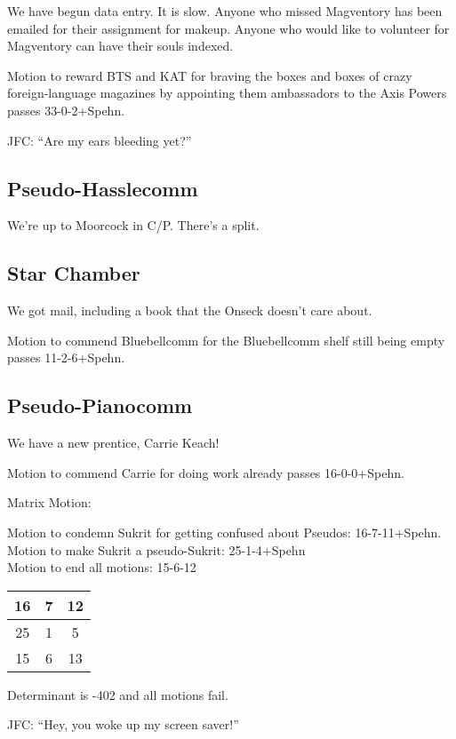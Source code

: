 \documentclass[10pt]{article}
\begin{document}
We have begun data entry.  It is slow.  Anyone who missed Magventory has been emailed for their assignment for makeup.  Anyone who would like to volunteer for Magventory can have their souls indexed.

Motion to reward BTS and KAT for braving the boxes and boxes of crazy foreign-language magazines by appointing them ambassadors to the Axis Powers passes 33-0-2+Spehn.  

JFC: ``Are my ears bleeding yet?''

\subsection*{Pseudo-Hasslecomm}

We're up to Moorcock in C/P.  There's a split.

\subsection*{Star Chamber}

We got mail, including a book that the Onseck doesn't care about.

Motion to commend Bluebellcomm for the Bluebellcomm shelf still being empty passes 11-2-6+Spehn.

\subsection*{Pseudo-Pianocomm}

We have a new prentice, Carrie Keach!

Motion to commend Carrie for doing work already passes 16-0-0+Spehn.

Matrix Motion:

\noindent
Motion to condemn Sukrit for getting confused about Pseudos: 16-7-11+Spehn.\\
Motion to make Sukrit a pseudo-Sukrit: 25-1-4+Spehn\\
Motion to end all motions: 15-6-12\\

\begin{tabular}{|c|c|c|}
\hline
16 & 7 & 12\\
\hline
25 & 1 & 5\\
\hline
15 & 6 & 13\\
\hline
\end{tabular}

Determinant is -402 and all motions fail.

JFC: ``Hey, you woke up my screen saver!''
\end{document}
